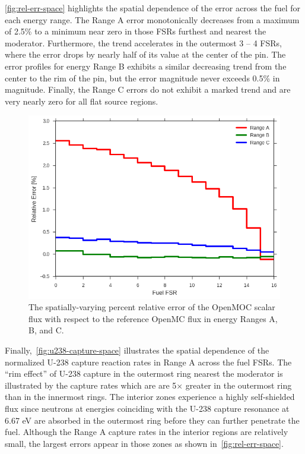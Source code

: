 \autoref{fig:rel-err-space} highlights the spatial dependence of the error across the fuel for each energy range. The Range A error monotonically decreases from a maximum of 2.5\% to a minimum near zero in those FSRs furthest and nearest the moderator. Furthermore,  the trend accelerates in the outermost 3 -- 4 FSRs, where the error drops by nearly half of its value at the center of the pin. The error profiles for energy Range B exhibits a similar decreasing trend from the center to the rim of the pin, but the error magnitude never exceeds 0.5\% in magnitude. Finally, the Range C errors do not exhibit a marked trend and are very nearly zero for all flat source regions.


\begin{figure}[h!]
\centering
\includegraphics[width=\linewidth]{figures/rel-err-fuel-fsrs}
\caption{The spatially-varying percent relative error of the OpenMOC scalar flux with respect to the reference OpenMC flux in energy Ranges A, B, and C.}
\label{fig:rel-err-space}
\end{figure}

Finally,~\autoref{fig:u238-capture-space} illustrates the spatial dependence of the normalized U-238 capture reaction rates in Range A across the fuel FSRs. The ``rim effect'' of U-238 capture in the outermost ring nearest the moderator is illustrated by the capture rates which are are 5$\times$ greater in the outermost ring than in the innermost rings. The interior zones experience a highly self-shielded flux since neutrons at energies coinciding with the U-238 capture resonance at 6.67 eV are absorbed in the outermost ring before they can further penetrate the fuel. Although the Range A capture rates in the interior regions are relatively small, the largest errors appear in those zones as shown in~\autoref{fig:rel-err-space}. 

